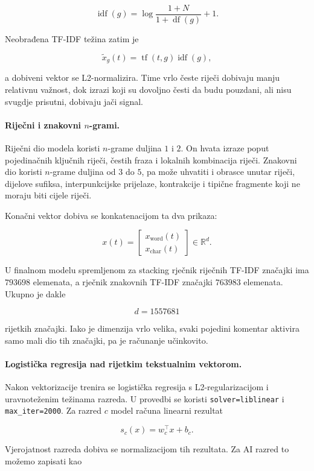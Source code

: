 \[
\operatorname{idf}(g)=\log\frac{1+N}{1+\operatorname{df}(g)}+1.
\]

Neobrađena TF-IDF težina zatim je

\[
\tilde x_g(t)=\operatorname{tf}(t,g)\operatorname{idf}(g),
\]

a dobiveni vektor se L2-normalizira. Time vrlo česte riječi dobivaju manju relativnu važnost, dok izrazi koji su dovoljno česti da budu pouzdani, ali nisu svugdje prisutni, dobivaju jači signal.

\paragraph{Riječni i znakovni $n$-grami.}
Riječni dio modela koristi $n$-grame duljina $1$ i $2$. On hvata izraze poput pojedinačnih ključnih riječi, čestih fraza i lokalnih kombinacija riječi. Znakovni dio koristi $n$-grame duljina od $3$ do $5$, pa može uhvatiti i obrasce unutar riječi, dijelove sufiksa, interpunkcijske prijelaze, kontrakcije i tipične fragmente koji ne moraju biti cijele riječi.

Konačni vektor dobiva se konkatenacijom ta dva prikaza:

\[
x(t)=
\begin{bmatrix}
x_{\mathrm{word}}(t)\\
x_{\mathrm{char}}(t)
\end{bmatrix}
\in\mathbb{R}^{d}.
\]

U finalnom modelu spremljenom za stacking rječnik riječnih TF-IDF značajki ima $793698$ elemenata, a rječnik znakovnih TF-IDF značajki $763983$ elemenata. Ukupno je dakle

\[
d=1557681
\]

rijetkih značajki. Iako je dimenzija vrlo velika, svaki pojedini komentar aktivira samo mali dio tih značajki, pa je računanje učinkovito.

\paragraph{Logistička regresija nad rijetkim tekstualnim vektorom.}
Nakon vektorizacije trenira se logistička regresija s L2-regularizacijom i uravnoteženim težinama razreda. U provedbi se koristi \texttt{solver=liblinear} i \texttt{max\_iter=2000}. Za razred $c$ model računa linearni rezultat

\[
s_c(x)=w_c^\top x+b_c.
\]

Vjerojatnost razreda dobiva se normalizacijom tih rezultata. Za AI razred to možemo zapisati kao


